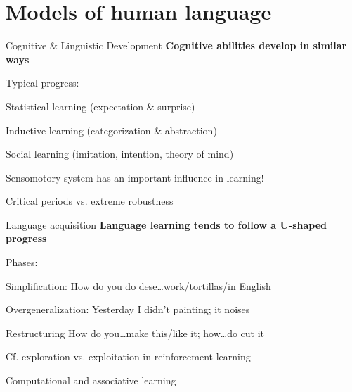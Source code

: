 \documentclass[aspectratio=169,cramped]{beamer}
\let\tempone\itemize
\let\temptwo\enditemize
\renewenvironment{itemize}{\tempone\addtolength{\itemsep}{-0\baselineskip}\addtolength{\parskip}{-0.2\baselineskip}}{\temptwo}
\newcommand{\ex}[1]{{\color{teal} #1}}
\begin{document}
\section{Models of human language}

\begin{frame}{Cognitive \& Linguistic Development}
	\textbf{Cognitive abilities develop in similar ways}
	\begin{itemize}
  \item Typical progress:
    \begin{itemize}
    \item Statistical learning (expectation \& surprise)
    \item Inductive learning (categorization \& abstraction)
    \item Social learning (imitation, intention, theory of mind)
    \end{itemize}
  \item Sensomotory system has an important influence in learning!
  \item Critical periods vs. extreme robustness
  \end{itemize}
\end{frame}

\begin{frame}{Language acquisition}
	\textbf{Language learning tends to follow a U-shaped progress}
	\begin{itemize}
    \item Phases:
    \begin{itemize}
    \item Simplification: \ex{How do you do dese\ldots work/tortillas/in English}
    \item Overgeneralization: \ex{Yesterday I didn’t painting; it noises}
    \item Restructuring \ex{How do you\ldots make this/like it; how\ldots do cut it}
    \end{itemize}
  \item Cf. exploration vs. exploitation in reinforcement learning
  \item Computational and associative learning
  \end{itemize}
\end{frame}
\end{document}
